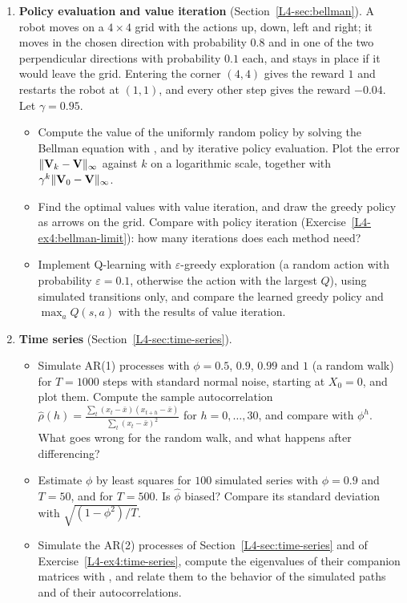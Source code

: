 \begin{enumerate}[label=\textbf{P\arabic*.}, leftmargin=*]
    \item \homework{} \textbf{Policy evaluation and value iteration} (Section~\ref{L4-sec:bellman}). A robot moves on a $4 \times 4$ grid with the actions up, down, left and right; it moves in the chosen direction with probability $0.8$ and in one of the two perpendicular directions with probability $0.1$ each, and stays in place if it would leave the grid. Entering the corner $(4, 4)$ gives the reward $1$ and restarts the robot at $(1, 1)$, and every other step gives the reward $-0.04$. Let $\gamma = 0.95$.
    \begin{itemize}
        \item Compute the value of the uniformly random policy by solving the Bellman equation with , and by iterative policy evaluation. Plot the error $\lVert \mathbf{V}_k - \mathbf{V} \rVert_\infty$ against $k$ on a logarithmic scale, together with $\gamma^k\lVert \mathbf{V}_0 - \mathbf{V} \rVert_\infty$.
        \item Find the optimal values with value iteration, and draw the greedy policy as arrows on the grid. Compare with policy iteration (Exercise~\ref{L4-ex4:bellman-limit}): how many iterations does each method need?
        \item Implement Q-learning with $\varepsilon$-greedy exploration (a random action with probability $\varepsilon = 0.1$, otherwise the action with the largest $Q$), using simulated transitions only, and compare the learned greedy policy and $\max_a Q(s, a)$ with the results of value iteration.
    \end{itemize}

    \item \textbf{Time series} (Section~\ref{L4-sec:time-series}).
    \begin{itemize}
        \item Simulate AR(1) processes with $\phi = 0.5$, $0.9$, $0.99$ and $1$ (a random walk) for $T = 1000$ steps with standard normal noise, starting at $X_0 = 0$, and plot them. Compute the sample autocorrelation $\hat\rho(h) = \frac{\sum_t (x_t - \bar x)(x_{t+h} - \bar x)}{\sum_t (x_t - \bar x)^2}$ for $h = 0, \ldots, 30$, and compare with $\phi^h$. What goes wrong for the random walk, and what happens after differencing?
        \item Estimate $\phi$ by least squares for $100$ simulated series with $\phi = 0.9$ and $T = 50$, and for $T = 500$. Is $\hat\phi$ biased? Compare its standard deviation with $\sqrt{(1 - \phi^2)/T}$.
        \item Simulate the AR(2) processes of Section~\ref{L4-sec:time-series} and of Exercise~\ref{L4-ex4:time-series}, compute the eigenvalues of their companion matrices with , and relate them to the behavior of the simulated paths and of their autocorrelations.
    \end{itemize}


\end{enumerate}
